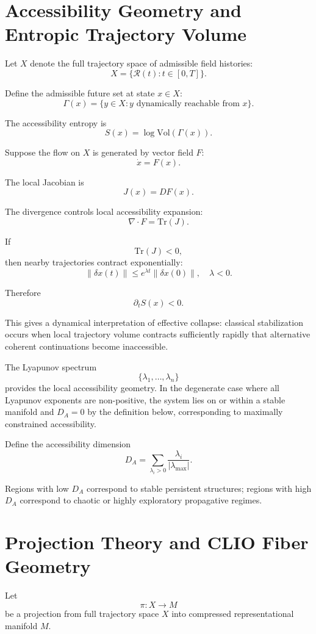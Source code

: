 \documentclass[12pt,a4paper]{article}
\begin{document}
\section{Accessibility Geometry and Entropic Trajectory Volume}

Let \(X\) denote the full trajectory space of admissible field histories:
\[
X
=
\{
\mathcal{R}(t)
:
t\in[0,T]
\}.
\]

Define the admissible future set at state \(x\in X\):
\[
\Gamma(x)
=
\{
y\in X
:
y \text{ dynamically reachable from } x
\}.
\]

The accessibility entropy is
\[
S(x)
=
\log\mathrm{Vol}(\Gamma(x)).
\]

Suppose the flow on \(X\) is generated by vector field \(F\):
\[
\dot{x}=F(x).
\]

The local Jacobian is
\[
J(x)=DF(x).
\]

The divergence controls local accessibility expansion:
\[
\nabla\cdot F
=
\mathrm{Tr}(J).
\]

If
\[
\mathrm{Tr}(J)<0,
\]
then nearby trajectories contract exponentially:
\[
\|\delta x(t)\|
\leq
e^{\lambda t}
\|\delta x(0)\|,
\quad
\lambda<0.
\]

Therefore
\[
\partial_t S(x)
<
0.
\]

This gives a dynamical interpretation of effective collapse: classical stabilization occurs when local trajectory volume contracts sufficiently rapidly that alternative coherent continuations become inaccessible.

The Lyapunov spectrum
\[
\{\lambda_1,\dots,\lambda_n\}
\]
provides the local accessibility geometry. In the degenerate case where all Lyapunov exponents are non-positive, the system lies on or within a stable manifold and \(D_A = 0\) by the definition below, corresponding to maximally constrained accessibility.

Define the accessibility dimension
\[
D_A
=
\sum_{\lambda_i>0}
\frac{\lambda_i}{|\lambda_{\max}|}.
\]

Regions with low \(D_A\) correspond to stable persistent structures; regions with high \(D_A\) correspond to chaotic or highly exploratory propagative regimes.

\section{Projection Theory and CLIO Fiber Geometry}

Let
\[
\pi : X \to M
\]
be a projection from full trajectory space \(X\) into compressed representational manifold \(M\).
\end{document}
